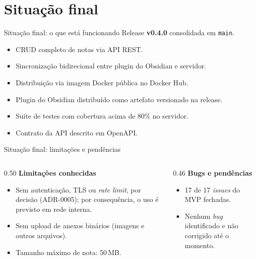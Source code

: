 \documentclass[aspectratio=169]{beamer}
\begin{document}
\section{Situação final}

\begin{frame}{Situação final: o que está funcionando}
    Release \textbf{v0.4.0} consolidada em \texttt{main}.
    \begin{itemize}
        \item CRUD completo de notas via API REST.
        \item Sincronização bidirecional entre plugin do Obsidian e servidor.
        \item Distribuição via imagem Docker pública no Docker Hub.
        \item Plugin do Obsidian distribuído como artefato versionado na release.
        \item Suíte de testes com cobertura acima de 80\% no servidor.
        \item Contrato da API descrito em OpenAPI.
    \end{itemize}
\end{frame}

\begin{frame}{Situação final: limitações e pendências}
    \begin{columns}[T]
        \begin{column}{0.50\textwidth}
            \textbf{Limitações conhecidas}
            \begin{itemize}
                \item Sem autenticação, TLS ou \textit{rate limit}, por decisão (ADR-0005); por consequência, o uso é previsto em rede interna.
                \item Sem upload de anexos binários (imagens e outros arquivos).
                \item Tamanho máximo de nota: 50\,MB.
            \end{itemize}
        \end{column}
        \begin{column}{0.46\textwidth}
            \textbf{Bugs e pendências}
            \begin{itemize}
                \item 17 de 17 \emph{issues} do MVP fechadas.
                \item Nenhum \emph{bug} identificado e não corrigido até o momento.
            \end{itemize}
        \end{column}
    \end{columns}
\end{frame}
\end{document}
